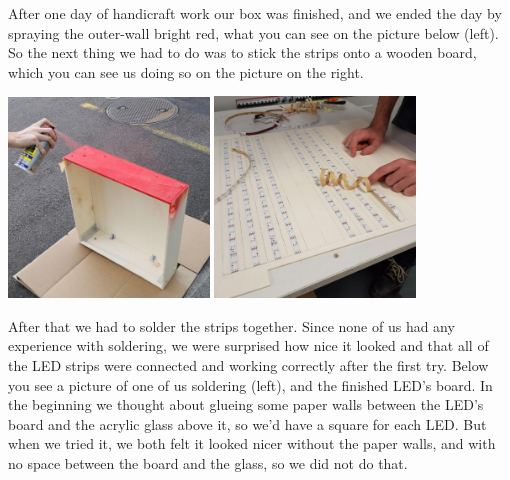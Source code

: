 \documentclass[a4paper,12pt]{article}
\begin{document}
After one day of handicraft work our box was finished, and we ended the day by spraying the outer-wall bright red, what you can see on the picture below (left).
 So the next thing we had to do was to stick the strips onto a wooden board, which you can see us doing so on the picture on the right.
 
 \vspace{1cm}

{ \centering
  \includegraphics[width = 0.4\textwidth]{sprayen.jpg}
  \space{   }
  \includegraphics[width = 0.4\textwidth]{kleben.jpg}
  \\}
 \vspace{1cm}
 
After that we had to solder the strips together.
 Since none of us had any experience with soldering, we were surprised how nice it looked and that all of the LED strips were connected and working correctly after the first try.
 Below you see a picture of one of us soldering (left), and the finished LED's board.
 In the beginning we thought about glueing some paper walls between the LED's board and the acrylic glass above it, so we'd have a square for each LED.
 But when we tried it, we both felt it looked nicer without the paper walls, and with no space between the board and the glass, so we did not do that.
 
 \vspace{1cm}
\end{document}
